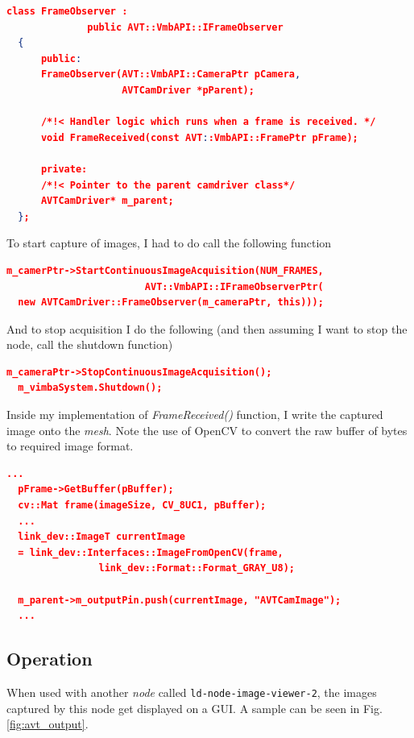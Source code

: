 \documentclass[a4paper, 12pt, oneside]{report}
\begin{document}
  \begin{lstlisting}[language=json,firstnumber=1]
  class FrameObserver :   
              public AVT::VmbAPI::IFrameObserver 
  {
      public:
      FrameObserver(AVT::VmbAPI::CameraPtr pCamera, 
                    AVTCamDriver *pParent);
      
      /*!< Handler logic which runs when a frame is received. */
      void FrameReceived(const AVT::VmbAPI::FramePtr pFrame);  
      
      private:
      /*!< Pointer to the parent camdriver class*/
      AVTCamDriver* m_parent;  
  };   
  \end{lstlisting}
  
  \noindent To start capture of images, I had to do call the following function
  
  \begin{lstlisting}[language=json,firstnumber=1]
  m_camerPtr->StartContinuousImageAcquisition(NUM_FRAMES, 
                        AVT::VmbAPI::IFrameObserverPtr(
  new AVTCamDriver::FrameObserver(m_cameraPtr, this)));
  \end{lstlisting}
  
  \noindent And to stop acquisition I do the following (and then assuming I want to stop the node, call the shutdown function)
  
  \begin{lstlisting}[language=json,firstnumber=1]
  m_cameraPtr->StopContinuousImageAcquisition();
  m_vimbaSystem.Shutdown();
  \end{lstlisting}
  
  \noindent Inside my implementation of \textit{FrameReceived()} function, I write the captured image onto the \textit{mesh}. Note the use of OpenCV \cite{OpenCVAPIReferenceOpenCV24137documentation-2020-02-17} to convert the raw buffer of bytes to required image format. 
  
  \begin{lstlisting}[language=json,firstnumber=1]
  ...
  pFrame->GetBuffer(pBuffer);
  cv::Mat frame(imageSize, CV_8UC1, pBuffer);
  ...
  link_dev::ImageT currentImage 
  = link_dev::Interfaces::ImageFromOpenCV(frame, 
                link_dev::Format::Format_GRAY_U8);   
  
  m_parent->m_outputPin.push(currentImage, "AVTCamImage");
  ...
  \end{lstlisting}
    
  \subsection{Operation}
  When used with another \textit{node} called \texttt{ld-node-image-viewer-2}, the images captured by this node get displayed on a GUI. A sample can be seen in Fig. \ref{fig:avt_output}.
    
\end{document}
